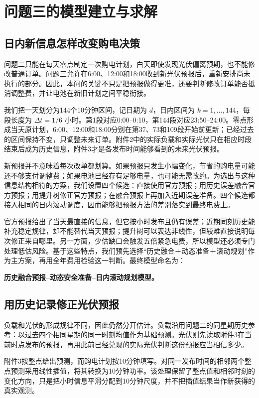 \section{问题三的模型建立与求解}
\subsection{日内新信息怎样改变购电决策}

问题二只能在每天零点制定一次购电计划，白天即使发现光伏偏离预期，也不能修改普通订单。问题三允许在6:00、12:00和18:00收到新光伏预报后，重新安排尚未执行的部分。因此，本问的关键不只是把预报做得更准，还要判断修改订单能否抵消调整费，并让电池在新旧计划之间平稳衔接。

我们把一天划分为144个10分钟区间，记日期为 $d$，日内区间为 $k=1,\ldots,144$，每段长度为 $\Delta t=1/6$ 小时。第1段对应0:00--0:10，第144段对应23:50--24:00。零点形成当天原计划，6:00、12:00和18:00分别在第37、73和109段开始前更新；已经过去的区间保持不变，只调整未来订单。附件2中的实际负载和实际光伏只在相应时段结束后成为历史信息，附件3才是各发布时间能够看到的未来光伏预报。

新预报并不意味着每次改单都划算。如果预报只发生小幅变化，节省的购电量可能还不够支付调整费；如果电池已经存有足够电量，也可能无需改约。为选出与这种信息结构相符的方案，我们设置四个候选：直接使用官方预报；用历史误差融合官方预报；用提升树修正官方预报；在融合预报上再加入近期误差准备。四个候选都接入相同的日内滚动调度，因而能够把预报方法的差别落实到最终电费上。

官方预报给出了当天最直接的信息，但它按小时发布且仍有误差；近期同刻历史能补充稳定规律，却不能替代当天预报；提升树可以表达非线性，但较难直接说明每次修正来自哪里。另一方面，少估缺口会触发五倍紧急电费，所以模型还必须专门处理低估风险。基于这些特点，我们预先选择“历史融合＋动态准备＋滚动规划”作为主方案，再用全年费用检验这一判断。最终模型命名为：

\textbf{历史融合预报--动态安全准备--日内滚动规划模型。}

\subsection{用历史记录修正光伏预报}

负载和光伏的形成规律不同，因此仍然分开估计。负载沿用问题二的同星期历史参考：以过去四个相同星期的同一时刻均值作为基础预测。光伏则先读取附件3在当前时点发布的预报，再用此前已经兑现的实际光伏判断这份预报应当相信多少。

附件3按整点给出预测，而购电计划按10分钟填写。对同一发布时间的相邻两个整点预测采用线性插值，将其转换为10分钟功率。该处理保留了整点值和相邻时刻的变化方向，只是把小时信息平滑分配到10分钟尺度，并不把插值结果当作新获得的真实观测。

